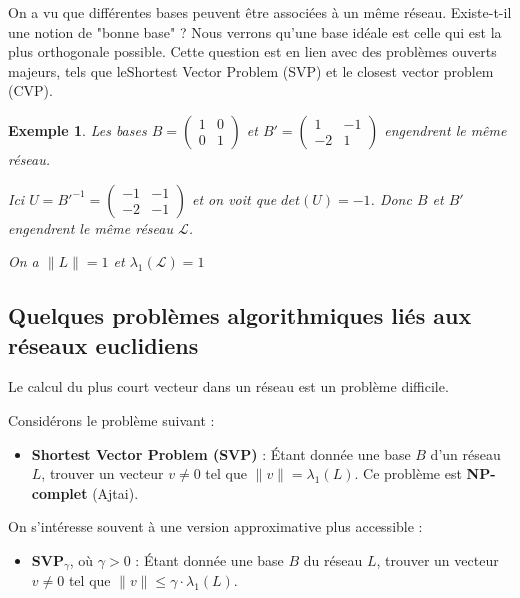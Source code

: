 \documentclass[a4paper,12pt]{report}  %
\theoremstyle{definitionstyle}
\theoremstyle{examplestyle}
\newtheorem{example}{Exemple}[chapter] %
\theoremstyle{remarkstyle}
\theoremstyle{propositionstyle}
\theoremstyle{theoremstyle}
\theoremstyle{proofstyle}
\begin{document}
	
	On a vu que différentes bases peuvent être associées à un même réseau. Existe-t-il une notion de "bonne base" ? Nous verrons qu'une base idéale est celle qui est la plus orthogonale possible. Cette question est en lien avec des problèmes ouverts majeurs, tels que leShortest Vector Problem (SVP) et le closest vector problem 
	 (CVP).
	\begin{example}
		Les bases $B = \left(\begin{array}{rr}1 & 0 \\0 & 1\end{array}\right)$ et $B'=\left(\begin{array}{rr}1 & -1 \\-2 & 1\end{array}\right)$ engendrent le même réseau.
		
		Ici $U = B'^{-1} = \left(\begin{array}{rr}-1 & -1 \\-2 & -1\end{array}\right)$ et on voit que $det(U)=-1$. Donc $B$ et $B'$ engendrent le même réseau $\mathcal{L}$.
		
		On a $\|L\| = 1$ et $\lambda_1( \mathcal{L}) = 1$
	\end{example}
	
	\subsection{Quelques problèmes algorithmiques liés aux réseaux euclidiens}
	
	Le calcul du plus court vecteur dans un réseau est un problème difficile.
	
	Considérons le problème suivant :
	
	\begin{itemize}
		\item \textbf{Shortest Vector Problem (SVP)} : Étant donnée une base $B$ d’un réseau $L$, trouver un vecteur $v \neq 0$ tel que $\|v\| = \lambda_1(L)$. Ce problème est \textbf{NP-complet} (Ajtai).
	\end{itemize}
	
	On s’intéresse souvent à une version approximative plus accessible :
	
	\begin{itemize}
		\item \textbf{SVP$_\gamma$}, où $\gamma > 0$ : Étant donnée une base $B$ du réseau $L$, trouver un vecteur $v \neq 0$ tel que $\|v\| \leq \gamma \cdot \lambda_1(L)$.
	\end{itemize}
	
\end{document}
